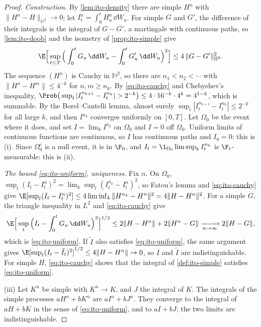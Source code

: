 \begin{proof}
\emph{Construction.} By \cref{lem:ito-density} there are simple $H^n$ with
$\|H^n-H\|_{\mathbb H^2}\to0$; let $I^n_t=\int_0^tH^n_u\,\dd W_u$. For simple $G$ and $G'$,
the difference of their integrals is the integral of $G-G'$, a martingale with continuous
paths, so \cref{lem:ito-doob} and the isometry of \cref{prop:ito-simple} give
\begin{equation}\label{eq:ito-cauchy}
  \E\Big[\sup_{t\le T}\Big(\int_0^tG_u\,\dd W_u-\int_0^tG'_u\,\dd W_u\Big)^2\Big]
  \le4\,\|G-G'\|_{\mathbb H^2}^2 .
\end{equation}
The sequence $(H^n)$ is Cauchy in $\mathbb H^2$, so there are $n_1<n_2<\cdots$ with
$\|H^n-H^m\|\le4^{-k}$ for $n,m\ge n_k$. By \eqref{eq:ito-cauchy} and Chebyshev's
inequality,
$\Prob\big(\sup_t|I^{n_{k+1}}_t-I^{n_k}_t|>2^{-k}\big)\le4\cdot16^{-k}\cdot4^{k}=4^{1-k}$,
which is summable. By the Borel--Cantelli lemma, almost surely
$\sup_t|I^{n_{k+1}}_t-I^{n_k}_t|\le2^{-k}$ for all large $k$, and then $I^{n_k}$ converges
uniformly on $[0,T]$. Let $\Omega_0$ be the event where it does, and set
$I=\lim_kI^{n_k}$ on $\Omega_0$ and $I=0$ off $\Omega_0$. Uniform limits of continuous
functions are continuous, so $I$ has continuous paths and $I_0=0$: this is (i). Since
$\Omega_0^c$ is a null event, it is in $\F_0$, and $I_t=\1_{\Omega_0}\limsup_kI^{n_k}_t$ is
$\F_t$-measurable: this is (ii).

\emph{The bound \eqref{eq:ito-uniform}, uniqueness.} Fix $n$. On $\Omega_0$,
$\sup_t(I_t-I^n_t)^2=\lim_k\sup_t(I^{n_k}_t-I^n_t)^2$, so Fatou's lemma and
\eqref{eq:ito-cauchy} give
$\E[\sup_t(I_t-I^n_t)^2]\le4\liminf_k\|H^{n_k}-H^n\|^2=4\|H-H^n\|^2$. For a simple $G$, the
triangle inequality in $L^2$ and \eqref{eq:ito-cauchy} give
\[
  \E\Big[\sup_t\Big(I_t-\int_0^tG_u\,\dd W_u\Big)^2\Big]^{1/2}
  \le2\|H-H^n\|+2\|H^n-G\|\xrightarrow[n\to\infty]{}2\|H-G\|,
\]
which is \eqref{eq:ito-uniform}. If $\tilde I$ also satisfies \eqref{eq:ito-uniform}, the
same argument gives $\E[\sup_t(I_t-\tilde I_t)^2]^{1/2}\le4\|H-H^n\|\to0$, so $I$ and $\tilde
I$ are indistinguishable. For simple $H$, \eqref{eq:ito-cauchy} shows that the integral of
\cref{def:ito-simple} satisfies \eqref{eq:ito-uniform}.

(iii) Let $K^n$ be simple with $K^n\to K$, and $J$ the integral of $K$. The integrals of the
simple processes $aH^n+bK^n$ are $aI^n+bJ^n$. They converge to the integral of $aH+bK$ in
the sense of \eqref{eq:ito-uniform}, and to $aI+bJ$; the two limits are indistinguishable.


\end{proof}
